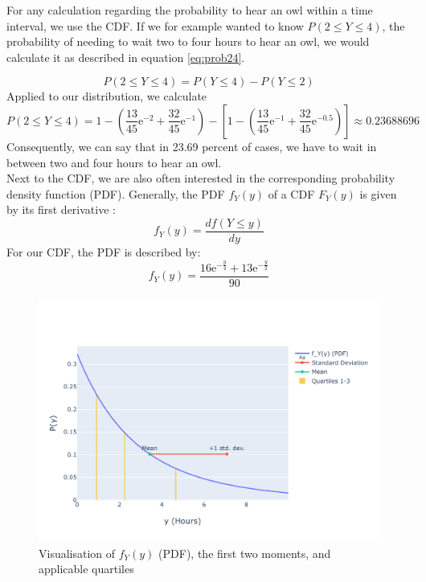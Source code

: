 For any calculation regarding the probability to hear an owl within a time interval, we use the CDF. If we for example wanted to know $P(2 \leq Y \leq 4)$, the probability of needing to wait two to four hours to hear an owl, we would calculate it as described in equation \eqref{eq:prob24}.

\begin{equation} P(2 \leq Y \leq 4) = P(Y \leq 4) - P(Y \leq 2)
\label{eq:prob24}
\end{equation}
Applied to our distribution, we calculate
\begin{equation} P (2 \leq Y \leq 4) =1-\left( \dfrac{13}{45}\mathrm{e}^{-2} + \dfrac{32}{45}\mathrm{e}^{-1}\right) -\left[ 1-\left( \dfrac{13}{45}\mathrm{e}^{-1} + \dfrac{32}{45}\mathrm{e}^{-0.5}\right)\right] 	\approx 0.23688696
\label{eq:probcalc24}
\end{equation}
Consequently, we can say that in 23.69 percent of cases, we have to wait in between two and four hours to hear an owl.
\\

Next to the CDF, we are also often interested in the corresponding probability density function (PDF). Generally, the PDF $f_Y(y)$ of a CDF $F_Y(y)$ is given by its first derivative \cite[Chapter~4.3]{montgomery2010applied}:
\begin{equation}
f_Y(y) = \frac{df(Y \leq y)}{dy}
\label{eq:firstderivative}
\end{equation}
For our CDF, the PDF is described by:
\begin{equation}
f_Y(y) = \dfrac{16\mathrm{e}^{-\frac{y}{4}}+13\mathrm{e}^{-\frac{y}{2}}}{90}
\label{eq:pdf}
\end{equation}

\begin{figure}[h]
\centering
\includegraphics[width=17cm]{pics/1c2.pdf}
\caption{Visualisation of $f_Y(y)$ (PDF), the first two moments, and applicable quartiles}
\label{fig:1c2}
\end{figure}
\FloatBarrier

